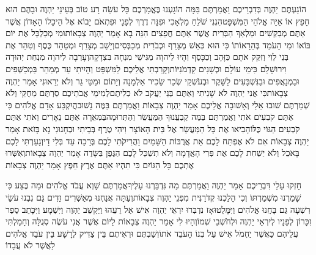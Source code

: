\documentclass[../main/main.tex]{subfiles}
\begin{document}
\begin{multicols}{\ncols}
הוֹגַעְתֶּם יַהְוֶה בְּדִבְרֵיכֶם וַאֲמַרְתֶּם בַּמָּה הוֹגָעְנוּ בֶּאֱמָרְכֶם כָּל עֹשֵׂה רָע טוֹב בְּעֵינֵי יַהְוֶה וּבָהֶם הוּא חָפֵץ אוֹ אַיֵּה אֱלֹהֵי הַמִּשְׁפָּט\PreChapterSpace{}הִנְנִי שֹׁלֵחַ מַלְאָכִי וּפִנָּה דֶרֶךְ לְפָנָי וּפִתְאֹם יָבוֹא אֶל הֵיכָלוֹ הָאָדוֹן אֲשֶׁר אַתֶּם מְבַקְשִׁים וּמַלְאַךְ הַבְּרִית אֲשֶׁר אַתֶּם חֲפֵצִים הִנֵּה בָא אָמַר יַהְוֶה צְבָאוֹת\PreVerseSpace{}וּמִי מְכַלְכֵּל אֶת יוֹם בּוֹאוֹ וּמִי הָעֹמֵד בְּהֵרָאוֹתוֹ כִּי הוּא כְּאֵשׁ מְצָרֵף וּכְבֹרִית מְכַבְּסִים\PreVerseSpace{}וְיָשַׁב מְצָרֵף וּמְטַהֵר כֶּסֶף וְטִהַר אֶת בְּנֵי לֵוִי וְזִקַּק אֹתָם כַּזָּהָב וְכַכָּסֶף וְהָיוּ לַיהוָה מַגִּישֵׁי מִנְחָה בִּצְדָקָה\PreVerseSpace{}וְעָרְבָה לַיהוָה מִנְחַת יְהוּדָה וִירוּשָׁלֵם כִּימֵי עוֹלָם וּכְשָׁנִים קַדְמֹנִיּוֹת\PreVerseSpace{}וְקָרַבְתִּי אֲלֵיכֶם לַמִּשְׁפָּט וְהָיִיתִי עֵד מְמַהֵר בַּמְכַשְּׁפִים וּבַמְנָאֲפִים וּבַנִּשְׁבָּעִים לַשָּׁקֶר וּבְעֹשְׁקֵי שְׂכַר שָׂכִיר אַלְמָנָה וְיָתוֹם וּמַטֵּי גֵר וְלֹא יְרֵאוּנִי אָמַר יַהְוֶה צְבָאוֹת\PreVerseSpace{}כִּי אֲנִי יַהְוֶה לֹא שָׁנִיתִי וְאַתֶּם בְּנֵי יַעֲקֹב לֹא כְלִיתֶם\PreVerseSpace{}לְמִימֵי אֲבֹתֵיכֶם סַרְתֶּם מֵחֻקַּי וְלֹא שְׁמַרְתֶּם שׁוּבוּ אֵלַי וְאָשׁוּבָה אֲלֵיכֶם אָמַר יַהְוֶה צְבָאוֹת וַאֲמַרְתֶּם בַּמֶּה נָשׁוּב\PreVerseSpace{}הֲיִקְבַּע אָדָם אֱלֹהִים כִּי אַתֶּם קֹבְעִים אֹתִי וַאֲמַרְתֶּם בַּמֶּה קְבַעֲנוּךָ הַמַּעֲשֵׂר וְהַתְּרוּמָה\PreVerseSpace{}בַּמְּאֵרָה אַתֶּם נֵאָרִים וְאֹתִי אַתֶּם קֹבְעִים הַגּוֹי כֻּלּוֹ\PreVerseSpace{}הָבִיאוּ אֶת כָּל הַמַּעֲשֵׂר אֶל בֵּית הָאוֹצָר וִיהִי טֶרֶף בְּבֵיתִי וּבְחָנוּנִי נָא בָּזֹאת אָמַר יַהְוֶה צְבָאוֹת אִם לֹא אֶפְתַּח לָכֶם אֵת אֲרֻבּוֹת הַשָּׁמַיִם וַהֲרִיקֹתִי לָכֶם בְּרָכָה עַד בְּלִי דָי\PreVerseSpace{}וְגָעַרְתִּי לָכֶם בָּאֹכֵל וְלֹא יַשְׁחִת לָכֶם אֶת פְּרִי הָאֲדָמָה וְלֹא תְשַׁכֵּל לָכֶם הַגֶּפֶן בַּשָּׂדֶה אָמַר יַהְוֶה צְבָאוֹת\PreVerseSpace{}וְאִשְּׁרוּ אֶתְכֶם כָּל הַגּוֹיִם כִּי תִהְיוּ אַתֶּם אֶרֶץ חֵפֶץ אָמַר יַהְוֶה צְבָאוֹת\OpenSection{}\par
{}חָזְקוּ עָלַי דִּבְרֵיכֶם אָמַר יַהְוֶה וַאֲמַרְתֶּם מַה נִּדְבַּרְנוּ עָלֶיךָ\PreVerseSpace{}אֲמַרְתֶּם שָׁוְא עֲבֹד אֱלֹהִים וּמַה בֶּצַע כִּי שָׁמַרְנוּ מִשְׁמַרְתּוֹ וְכִי הָלַכְנוּ קְדֹרַנִּית מִפְּנֵי יַהְוֶה צְבָאוֹת\PreVerseSpace{}וְעַתָּה אֲנַחְנוּ מְאַשְּׁרִים זֵדִים גַּם נִבְנוּ עֹשֵׂי רִשְׁעָה גַּם בָּחֲנוּ אֱלֹהִים וַיִּמָּלֵטוּ\PreVerseSpace{}אָז נִדְבְּרוּ יִרְאֵי יַהְוֶה אִישׁ אֶל\SubEnd{} רֵעֵהוּ וַיַּקְשֵׁב יַהְוֶה וַיִּשְׁמָע וַיִּכָּתֵב סֵפֶר זִכָּרוֹן לְפָנָיו לְיִרְאֵי יַהְוֶה וּלְחֹשְׁבֵי שְׁמוֹ\PreVerseSpace{}וְהָיוּ לִי אָמַר יַהְוֶה צְבָאוֹת לַיּוֹם אֲשֶׁר אֲנִי עֹשֶׂה סְגֻלָּה וְחָמַלְתִּי עֲלֵיהֶם כַּאֲשֶׁר יַחְמֹל אִישׁ עַל בְּנוֹ הָעֹבֵד אֹתוֹ\PreVerseSpace{}וְשַׁבְתֶּם וּרְאִיתֶם בֵּין צַדִּיק לְרָשָׁע בֵּין עֹבֵד אֱלֹהִים לַאֲשֶׁר לֹא עֲבָדוֹ\OpenSection{}\par

\end{multicols}
\end{document}
